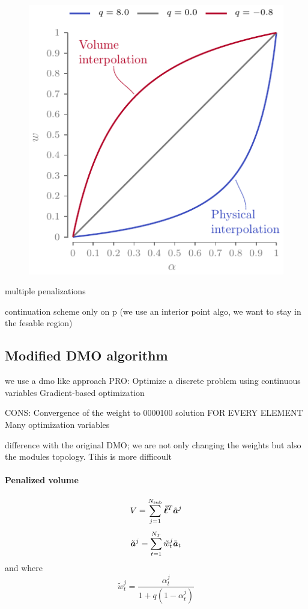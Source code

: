 \begin{figure}
    \centering
    \includegraphics{figures/06_DMO/00_ramp/ramp.pdf}
    \caption{}
    \label{fig:06}
\end{figure}

multiple penalizations

continuation scheme only on p (we use an interior point algo, we want to stay in the fesable region)


\subsection{Modified DMO algorithm}
we use a dmo like approach
PRO:
Optimize a discrete problem using continuous variables
Gradient-based optimization

CONS:
Convergence of the weight to 0000100 solution FOR EVERY ELEMENT
Many optimization variables

difference with the original DMO; we are not only changing the weights but also the modules topology. Tihis is more difficoult
\paragraph*{Penalized volume}
\begin{equation}
    V = \sum_{j=1}^{N_{\text{sub}}}\bm{\bar{\ell}}^T\tilde{\bm{a}}^j
\end{equation}
\begin{equation}
    \tilde{\bm{a}}^j = \sum_{t=1}^{N_T} \tilde{w}_t^j \bar{\bm{a}}_t 
\end{equation}
and where
\begin{equation}
    \tilde{w}_t^j = \frac{\alpha_t^j}{1+q(1-\alpha_t^j)}    
\end{equation}


